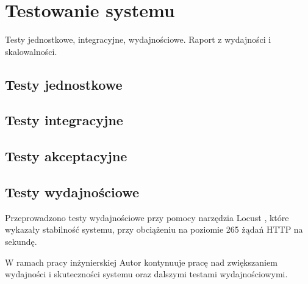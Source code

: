 \clearpage %

\section{Testowanie systemu}

Testy jednostkowe, integracyjne, wydajnościowe. Raport z wydajności i skalowalności.

\subsection{Testy jednostkowe}

\subsection{Testy integracyjne}

\subsection{Testy akceptacyjne}

\subsection{Testy wydajnościowe}

Przeprowadzono testy wydajnościowe przy pomocy narzędzia Locust \cite{locust}, które wykazały stabilność systemu, przy obciążeniu na poziomie 265 żądań HTTP na sekundę.

W ramach pracy inżynierskiej Autor kontynuuje pracę nad zwiększaniem wydajności i skuteczności systemu oraz dalszymi testami wydajnościowymi.